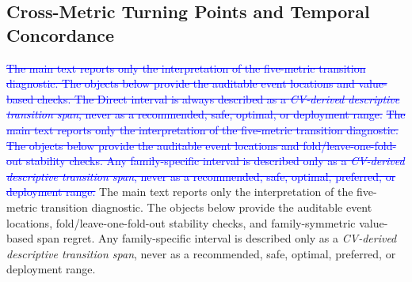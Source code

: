\documentclass[10pt]{article}
\theoremstyle{definition}
\newcommand{\1}{\mathbf{1}}
\newcommand{\oldtext}[1]{\textcolor{blue}{\sout{#1}}}
\newcommand{\latesttext}[1]{\textcolor{latestPurple}{#1}}
\begin{document}
\subsection{\texorpdfstring{\textcolor{latestPurple}{Cross-Metric Turning Points and Temporal Concordance}}{Cross-Metric Turning Points and Temporal Concordance}}
\label{subsec:transition_appendix}

\oldtext{The main text reports only the interpretation of the five-metric transition diagnostic. The objects below provide the auditable event locations and value-based checks. The Direct interval is always described as a \emph{CV-derived descriptive transition span}, never as a recommended, safe, optimal, or deployment range.}
\oldtext{The main text reports only the interpretation of the five-metric transition diagnostic. The objects below provide the auditable event locations and fold/leave-one-fold-out stability checks. Any family-specific interval is described only as a \emph{CV-derived descriptive transition span}, never as a recommended, safe, optimal, preferred, or deployment range.}
\latesttext{The main text reports only the interpretation of the five-metric transition diagnostic. The objects below provide the auditable event locations, fold/leave-one-fold-out stability checks, and family-symmetric value-based span regret. Any family-specific interval is described only as a \emph{CV-derived descriptive transition span}, never as a recommended, safe, optimal, preferred, or deployment range.}
\end{document}
